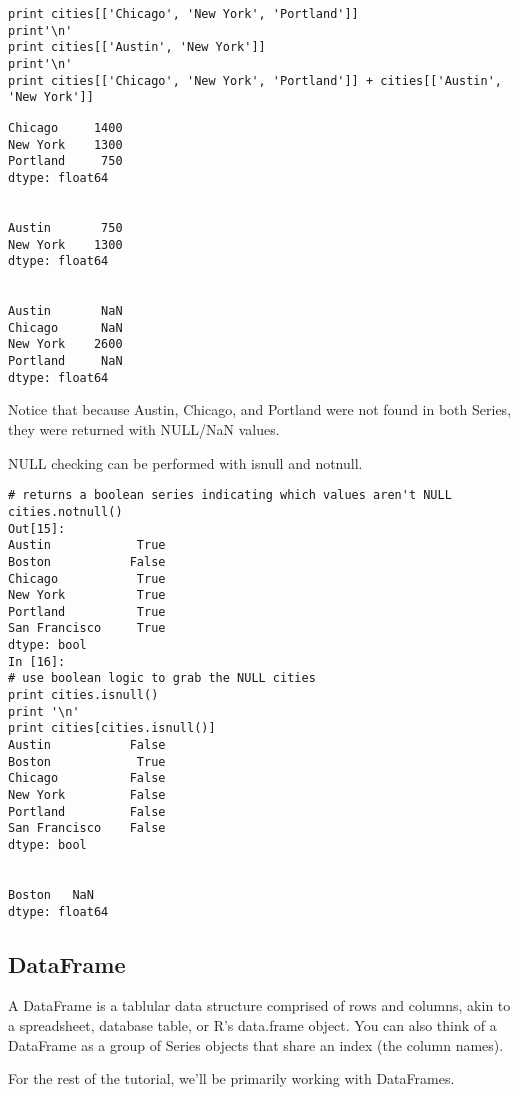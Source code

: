 \documentclass[KSmain.tex]{subfiles}
\begin{document}
\begin{framed}
\begin{verbatim}
print cities[['Chicago', 'New York', 'Portland']]
print'\n'
print cities[['Austin', 'New York']]
print'\n'
print cities[['Chicago', 'New York', 'Portland']] + cities[['Austin', 'New York']]
\end{verbatim}
\end{framed}
\begin{verbatim}
Chicago     1400
New York    1300
Portland     750
dtype: float64


Austin       750
New York    1300
dtype: float64


Austin       NaN
Chicago      NaN
New York    2600
Portland     NaN
dtype: float64
\end{verbatim}

Notice that because Austin, Chicago, and Portland were not found in both Series, they were returned with NULL/NaN values.

NULL checking can be performed with isnull and notnull.
\begin{framed}
\begin{verbatim}
# returns a boolean series indicating which values aren't NULL
cities.notnull()
Out[15]:
Austin            True
Boston           False
Chicago           True
New York          True
Portland          True
San Francisco     True
dtype: bool
In [16]:
# use boolean logic to grab the NULL cities
print cities.isnull()
print '\n'
print cities[cities.isnull()]
Austin           False
Boston            True
Chicago          False
New York         False
Portland         False
San Francisco    False
dtype: bool


Boston   NaN
dtype: float64
\end{verbatim}
\end{framed}


\newpage
\subsection{DataFrame}


A DataFrame is a tablular data structure comprised of rows and columns, akin to a spreadsheet, database table, or R's data.frame object. You can also think of a DataFrame as a group of Series objects that share an index (the column names).

For the rest of the tutorial, we'll be primarily working with DataFrames.
\end{document}
